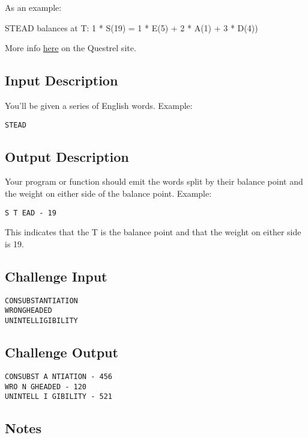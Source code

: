 As an example:

STEAD balances at T: 1 * S(19) = 1 * E(5) + 2 * A(1) + 3 * D(4))

More info
\href{http://www.questrel.com/records.html\#spelling_alphabetical_order_entire_word_balance_points}{here}
on the Questrel site.

\subsection{Input Description}\label{input-description}

You'll be given a series of English words. Example:

\begin{verbatim}
STEAD
\end{verbatim}

\subsection{Output Description}\label{output-description}

Your program or function should emit the words split by their balance
point and the weight on either side of the balance point. Example:

\begin{verbatim}
S T EAD - 19
\end{verbatim}

This indicates that the T is the balance point and that the weight on
either side is 19.

\subsection{Challenge Input}\label{challenge-input-1}

\begin{verbatim}
CONSUBSTANTIATION
WRONGHEADED
UNINTELLIGIBILITY
\end{verbatim}

\subsection{Challenge Output}\label{challenge-output}

\begin{verbatim}
CONSUBST A NTIATION - 456
WRO N GHEADED - 120
UNINTELL I GIBILITY - 521
\end{verbatim}

\subsection{Notes}\label{notes}

